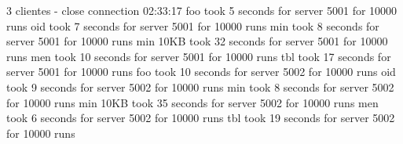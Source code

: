 \documentclass[11pt]{article}
\begin{document}
 3 clientes - close connection
02:33:17
foo took 5 seconds for server 5001 for 10000 runs
oid took 7 seconds for server 5001 for 10000 runs
min took 8 seconds for server 5001 for 10000 runs
min 10KB took 32 seconds for server 5001 for 10000 runs
men took 10 seconds for server 5001 for 10000 runs
tbl took 17 seconds for server 5001 for 10000 runs
foo took 10 seconds for server 5002 for 10000 runs
oid took 9 seconds for server 5002 for 10000 runs
min took 8 seconds for server 5002 for 10000 runs
min 10KB took 35 seconds for server 5002 for 10000 runs
men took 6 seconds for server 5002 for 10000 runs
tbl took 19 seconds for server 5002 for 10000 runs



\end{document}
